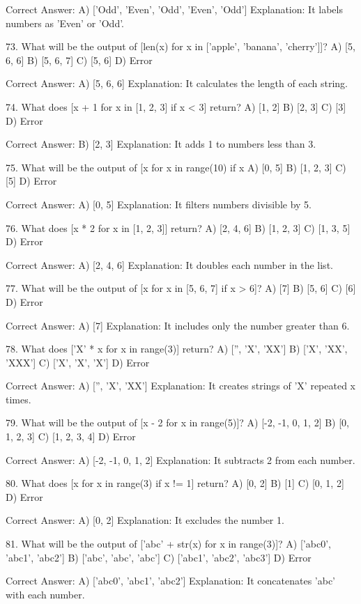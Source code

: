 Correct Answer: A) ['Odd', 'Even', 'Odd', 'Even', 'Odd']
Explanation: It labels numbers as 'Even' or 'Odd'.

73. What will be the output of [len(x) for x in ['apple', 'banana', 'cherry']]?
A) [5, 6, 6]
B) [5, 6, 7]
C) [5, 6]
D) Error

Correct Answer: A) [5, 6, 6]
Explanation: It calculates the length of each string.

74. What does [x + 1 for x in [1, 2, 3] if x < 3] return?
A) [1, 2]
B) [2, 3]
C) [3]
D) Error

Correct Answer: B) [2, 3]
Explanation: It adds 1 to numbers less than 3.

75. What will be the output of [x for x in range(10) if x %
A) [0, 5]
B) [1, 2, 3]
C) [5]
D) Error

Correct Answer: A) [0, 5]
Explanation: It filters numbers divisible by 5.

76. What does [x * 2 for x in [1, 2, 3]] return?
A) [2, 4, 6]
B) [1, 2, 3]
C) [1, 3, 5]
D) Error

Correct Answer: A) [2, 4, 6]
Explanation: It doubles each number in the list.

77. What will be the output of [x for x in [5, 6, 7] if x > 6]?
A) [7]
B) [5, 6]
C) [6]
D) Error

Correct Answer: A) [7]
Explanation: It includes only the number greater than 6.

78. What does ['X' * x for x in range(3)] return?
A) ['', 'X', 'XX']
B) ['X', 'XX', 'XXX']
C) ['X', 'X', 'X']
D) Error

Correct Answer: A) ['', 'X', 'XX']
Explanation: It creates strings of 'X' repeated x times.

79. What will be the output of [x - 2 for x in range(5)]?
A) [-2, -1, 0, 1, 2]
B) [0, 1, 2, 3]
C) [1, 2, 3, 4]
D) Error

Correct Answer: A) [-2, -1, 0, 1, 2]
Explanation: It subtracts 2 from each number.

80. What does [x for x in range(3) if x != 1] return?
A) [0, 2]
B) [1]
C) [0, 1, 2]
D) Error

Correct Answer: A) [0, 2]
Explanation: It excludes the number 1.

81. What will be the output of ['abc' + str(x) for x in range(3)]?
A) ['abc0', 'abc1', 'abc2']
B) ['abc', 'abc', 'abc']
C) ['abc1', 'abc2', 'abc3']
D) Error

Correct Answer: A) ['abc0', 'abc1', 'abc2']
Explanation: It concatenates 'abc' with each number.

